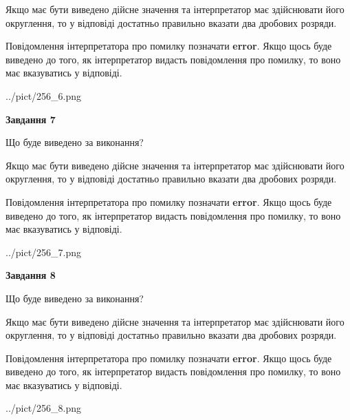 \documentclass[12pt, ukrainian]{article}
\begin{document}
{\begin {Large}
Якщо має бути виведено дійсне значення та інтерпретатор має здійснювати його округлення, 
то у відповіді достатньо правильно вказати два дробових розряди.

Повідомлення інтерпретатора про помилку позначати \textbf{error}.
Якщо щось буде виведено до того, як інтерпретатор видасть повідомлення про помилку, 
то воно має вказуватись у відповіді. \par

\begin{center}
	{../pict/256_6.png}
\end{center}
\newpage

{\begin {center}\textbf{Завдання 7}\end {center}}\par
Що буде виведено за виконання? \par

Якщо має бути виведено дійсне значення та інтерпретатор має здійснювати його округлення, 
то у відповіді достатньо правильно вказати два дробових розряди.

Повідомлення інтерпретатора про помилку позначати \textbf{error}.
Якщо щось буде виведено до того, як інтерпретатор видасть повідомлення про помилку, 
то воно має вказуватись у відповіді. \par

\begin{center}
	{../pict/256_7.png}
\end{center}
\newpage

{\begin {center}\textbf{Завдання 8}\end {center}}\par
Що буде виведено за виконання? \par

Якщо має бути виведено дійсне значення та інтерпретатор має здійснювати його округлення, 
то у відповіді достатньо правильно вказати два дробових розряди.

Повідомлення інтерпретатора про помилку позначати \textbf{error}.
Якщо щось буде виведено до того, як інтерпретатор видасть повідомлення про помилку, 
то воно має вказуватись у відповіді. \par

\begin{center}
	{../pict/256_8.png}
\end{center}
\newpage


\end{Large}}
\end{document}
